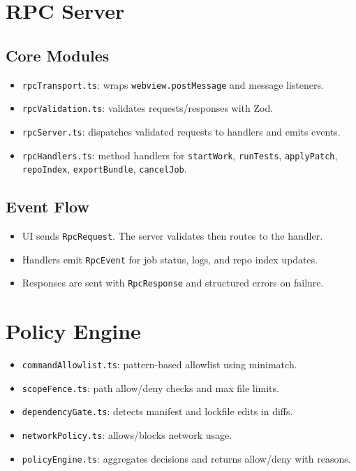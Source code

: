 \documentclass[11pt]{article}
\begin{document}
\section{RPC Server}
\subsection{Core Modules}
\begin{itemize}[noitemsep]
  \item \texttt{rpcTransport.ts}: wraps \texttt{webview.postMessage} and message listeners.
  \item \texttt{rpcValidation.ts}: validates requests/responses with Zod.
  \item \texttt{rpcServer.ts}: dispatches validated requests to handlers and emits events.
  \item \texttt{rpcHandlers.ts}: method handlers for \texttt{startWork}, \texttt{runTests}, \texttt{applyPatch},
        \texttt{repoIndex}, \texttt{exportBundle}, \texttt{cancelJob}.
\end{itemize}

\subsection{Event Flow}
\begin{itemize}[noitemsep]
  \item UI sends \texttt{RpcRequest}. The server validates then routes to the handler.
  \item Handlers emit \texttt{RpcEvent} for job status, logs, and repo index updates.
  \item Responses are sent with \texttt{RpcResponse} and structured errors on failure.
\end{itemize}

\section{Policy Engine}
\begin{itemize}[noitemsep]
  \item \texttt{commandAllowlist.ts}: pattern-based allowlist using minimatch.
  \item \texttt{scopeFence.ts}: path allow/deny checks and max file limits.
  \item \texttt{dependencyGate.ts}: detects manifest and lockfile edits in diffs.
  \item \texttt{networkPolicy.ts}: allows/blocks network usage.
  \item \texttt{policyEngine.ts}: aggregates decisions and returns allow/deny with reasons.
\end{itemize}
\end{document}
